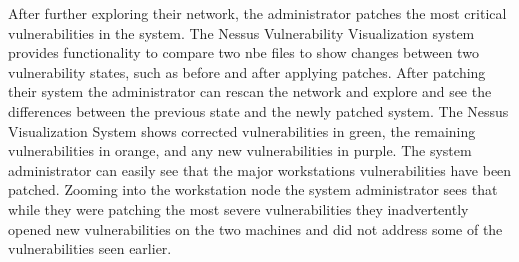 \documentclass{acm_proc_article-sp}
\begin{document}
After further exploring their network, the administrator patches the most critical
vulnerabilities in the system. The Nessus Vulnerability Visualization system
provides functionality to compare two nbe files to show changes between two
vulnerability states, such as before and after applying patches. After patching
their system the administrator can rescan the network and explore and see the
differences between the previous state and the newly patched system.
The Nessus Visualization System shows corrected
vulnerabilities in green, the remaining vulnerabilities in orange, and any new
vulnerabilities in purple. The system administrator can easily see that the
major workstations vulnerabilities have been patched. Zooming into the
workstation node the system administrator sees that while they were patching the most
severe vulnerabilities they inadvertently opened new vulnerabilities on the two
machines and did not address some of the vulnerabilities seen earlier.
\end{document}
